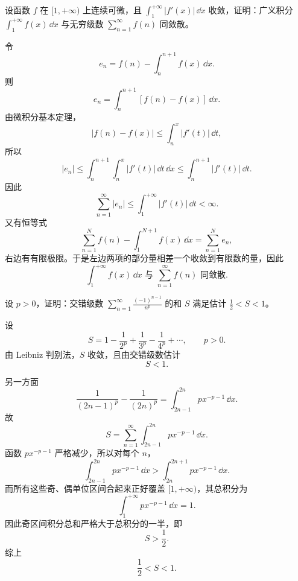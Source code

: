 \begin{xreferenceproblem}[14]
设函数 $f$ 在 $[1,+\infty)$ 上连续可微，且 $\int_1^{+\infty}|f'(x)|\,\dd x$ 收敛，证明：广义积分 $\int_1^{+\infty}f(x)\,\dd x$ 与无穷级数 $\sum_{n=1}^{\infty}f(n)$ 同敛散。
\end{xreferenceproblem}
\begin{xsolution}
令
\[
 e_n=f(n)-\int_n^{n+1}f(x)\,\dd x.
\]
则
\[
 e_n=\int_n^{n+1}[f(n)-f(x)]\,\dd x.
\]
由微积分基本定理，
\[
 |f(n)-f(x)|
 \leq\int_n^x|f'(t)|\,\dd t,
\]
所以
\[
 |e_n|
 \leq\int_n^{n+1}\int_n^x|f'(t)|\,\dd t\,\dd x
 \leq\int_n^{n+1}|f'(t)|\,\dd t.
\]
因此
\[
 \sum_{n=1}^{\infty}|e_n|
 \leq\int_1^{+\infty}|f'(t)|\,\dd t<\infty.
\]
又有恒等式
\[
 \sum_{n=1}^{N}f(n)-\int_1^{N+1}f(x)\,\dd x
 =\sum_{n=1}^{N}e_n,
\]
右边有有限极限。于是左边两项的部分量相差一个收敛到有限数的量，因此
\[
 \boxed{\int_1^{+\infty}f(x)\,\dd x\text{ 与 }\sum_{n=1}^{\infty}f(n)\text{ 同敛散}.}
\]
\end{xsolution}


\begin{xreferenceproblem}[15]
设 $p>0$，证明：交错级数 $\sum_{n=1}^{\infty}\frac{(-1)^{n-1}}{n^p}$ 的和 $S$ 满足估计 $\frac12<S<1$。
\end{xreferenceproblem}
\begin{xsolution}
设
\[
 S=1-\frac1{2^p}+\frac1{3^p}-\frac1{4^p}+\cdots,
 \qquad p>0.
\]
由 Leibniz 判别法，$S$ 收敛，且由交错级数估计
\[
 S<1.
\]

另一方面
\[
 \frac1{(2n-1)^p}-\frac1{(2n)^p}
 =\int_{2n-1}^{2n}p x^{-p-1}\,\dd x.
\]
故
\[
 S=\sum_{n=1}^{\infty}\int_{2n-1}^{2n}p x^{-p-1}\,\dd x.
\]
函数 $p x^{-p-1}$ 严格减少，所以对每个 $n$，
\[
 \int_{2n-1}^{2n}p x^{-p-1}\,\dd x
 >\int_{2n}^{2n+1}p x^{-p-1}\,\dd x.
\]
而所有这些奇、偶单位区间合起来正好覆盖 $[1,+\infty)$，其总积分为
\[
 \int_1^{+\infty}p x^{-p-1}\,\dd x=1.
\]
因此奇区间积分总和严格大于总积分的一半，即
\[
 S>\frac12.
\]
综上
\[
 \boxed{\frac12<S<1}.
\]
\end{xsolution}


